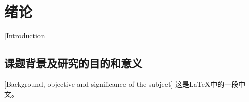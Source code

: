 
\chapter{绪论}[Introduction]
\section{课题背景及研究的目的和意义}[Background, objective and significance of the subject]
这是\LaTeX 中的一段中文\cite{man}。

\lipsum[1]

\nocite{*}


